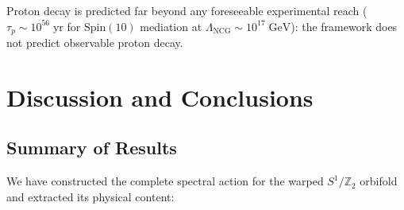Proton decay is predicted far beyond any foreseeable experimental reach ($\tau_p \sim 10^{56}\;\mathrm{yr}$ for $\mathrm{Spin}(10)$ mediation at $\Lambda_{\mathrm{NCG}} \sim 10^{17}\;\mathrm{GeV}$): the framework does not predict observable proton decay.


\section{Discussion and Conclusions}
\label{sec:4-conclusions}

\subsection{Summary of Results}
\label{sec:4-summary}

We have constructed the complete spectral action for the warped $S^1/\mathbb{Z}_2$ orbifold and extracted its physical content:

